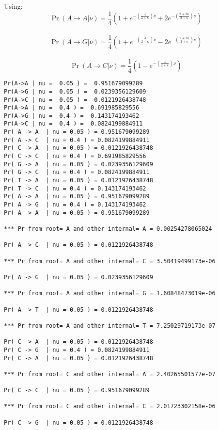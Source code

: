 \documentclass[landscape]{foils}
\begin{document}
\pagecolor{white}


\tiny
Using:
$$\Pr(A\rightarrow A|\nu) = \frac{1}{4}\left(1 + e^{-\left(\frac{4}{2+\kappa}\right)\nu} + 2e^{-\left(\frac{2+2\kappa}{2+\kappa}\right)\nu}\right)$$\\
$$\Pr(A\rightarrow G|\nu) = \frac{1}{4}\left(1 + e^{-\left(\frac{4}{2+\kappa}\right)\nu} - 2e^{-\left(\frac{2+2\kappa}{2+\kappa}\right)\nu}\right)$$\\
$$\Pr(A\rightarrow C|\nu) = \frac{1}{4}\left(1 - e^{-\left(\frac{4}{2+\kappa}\right)\nu}\right)$$


\begin{verbatim}
Pr(A->A | nu =  0.05 ) =  0.951679099289
Pr(A->G | nu =  0.05 ) =  0.0239356129609
Pr(A->C | nu =  0.05 ) =  0.0121926438748
Pr(A->A | nu =  0.4 ) =  0.691985829556
Pr(A->G | nu =  0.4 ) =  0.143174193462
Pr(A->C | nu =  0.4 ) =  0.0824199884911
Pr( A -> A  | nu = 0.05 ) = 0.951679099289
Pr( A -> C  | nu = 0.4 ) = 0.0824199884911
Pr( C -> A  | nu = 0.05 ) = 0.0121926438748
Pr( C -> C  | nu = 0.4 ) = 0.691985829556
Pr( G -> A  | nu = 0.05 ) = 0.0239356129609
Pr( G -> C  | nu = 0.4 ) = 0.0824199884911
Pr( T -> A  | nu = 0.05 ) = 0.0121926438748
Pr( T -> C  | nu = 0.4 ) = 0.143174193462
Pr( A -> A  | nu = 0.05 ) = 0.951679099289
Pr( A -> G  | nu = 0.4 ) = 0.143174193462
Pr( A -> A  | nu = 0.05 ) = 0.951679099289

*** Pr from root= A and other internal= A = 0.00254278065024 

Pr( A -> C  | nu = 0.05 ) = 0.0121926438748

*** Pr from root= A and other internal= C = 3.50419499173e-06 

Pr( A -> G  | nu = 0.05 ) = 0.0239356129609

*** Pr from root= A and other internal= G = 1.60848473019e-06 

Pr( A -> T  | nu = 0.05 ) = 0.0121926438748

*** Pr from root= A and other internal= T = 7.25029719173e-07 

Pr( C -> A  | nu = 0.05 ) = 0.0121926438748
Pr( C -> G  | nu = 0.4 ) = 0.0824199884911
Pr( C -> A  | nu = 0.05 ) = 0.0121926438748

*** Pr from root= C and other internal= A = 2.40265501577e-07 

Pr( C -> C  | nu = 0.05 ) = 0.951679099289

*** Pr from root= C and other internal= C = 2.01723302158e-06 

Pr( C -> G  | nu = 0.05 ) = 0.0121926438748


\end{verbatim}
\end{document}
